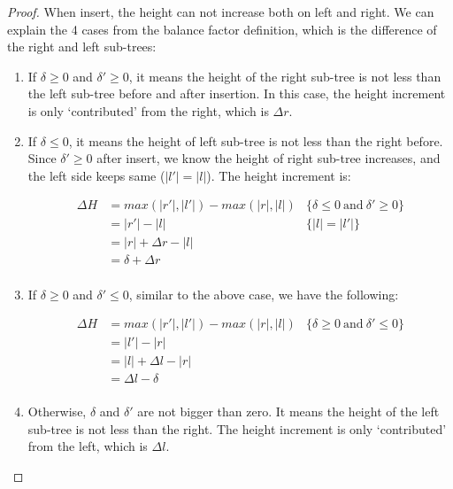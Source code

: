\documentclass[b5paper]{article}
\begin{document}
\begin{proof}
When insert, the height can not increase both on left and right. We can explain the 4 cases from the balance factor definition, which is the difference of the right and left sub-trees:

\begin{enumerate}
\item If $\delta \geq 0$ and $\delta' \geq 0$, it means the height
of the right sub-tree is not less than the left sub-tree before and after insertion. In this case, the height increment is only `contributed' from the right, which is $\Delta r$.

\item If $\delta \leq 0$, it means the height of left sub-tree is not less than the right before. Since $\delta' \geq 0$ after insert, we know the height of right sub-tree increases, and the left side keeps same ($|l'|=|l|$). The height increment is:

\[
\begin{array}{rll}
\Delta H & = max(|r'|, |l'|) - max (|r|, |l|) & \{\delta \leq 0\ \text{and}\ \delta' \geq 0 \}\\
         & = |r'|-|l| & \{|l|=|l'|\}\\
         & = |r|+\Delta r - |l| & \\
         & = \delta + \Delta r & \\
\end{array}
\]

\item If $\delta \geq 0$ and $\delta' \leq 0$, similar to the above case, we have the following:

\[
\begin{array}{rll}
\Delta H & = max(|r'|, |l'|) - max (|r|, |l|) & \{\delta \geq 0\ \text{and}\ \delta' \leq 0 \}\\
         & = |l'|-|r| & \\
         & = |l| + \Delta l - |r| & \\
         & = \Delta l - \delta & \\
\end{array}
\]

\item Otherwise, $\delta$ and $\delta'$ are not bigger than zero. It means the height of the left sub-tree is not less than the right. The height increment is only `contributed' from the left, which is $\Delta l$.
\end{enumerate}
\end{proof}
\end{document}
